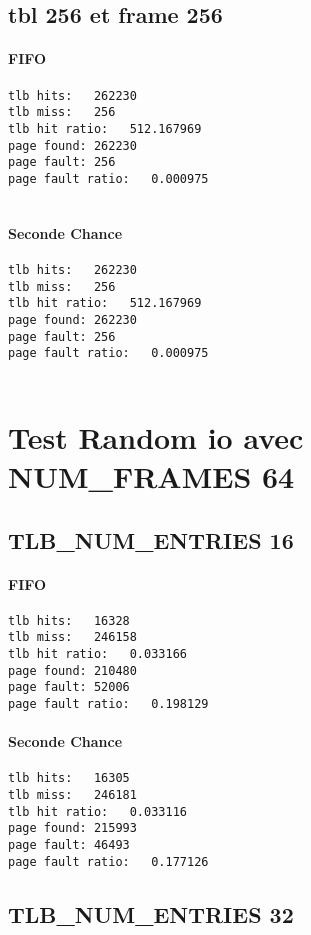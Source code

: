 \documentclass{article}
\begin{document}
\subsection*{tbl 256 et frame 256}
\paragraph{FIFO}
\begin{lstlisting}
tlb hits:   262230
tlb miss:   256
tlb hit ratio:   512.167969
page found: 262230
page fault: 256
page fault ratio:   0.000975


\end{lstlisting}
\paragraph{Seconde Chance}
\begin{lstlisting}
tlb hits:   262230
tlb miss:   256
tlb hit ratio:   512.167969
page found: 262230
page fault: 256
page fault ratio:   0.000975


\end{lstlisting}
\section*{Test Random io avec NUM_FRAMES   64}
\subsection*{TLB_NUM_ENTRIES   16 }

\paragraph{FIFO}
\begin{lstlisting}
tlb hits:   16328
tlb miss:   246158
tlb hit ratio:   0.033166
page found: 210480
page fault: 52006
page fault ratio:   0.198129

\end{lstlisting}
\paragraph{Seconde Chance}
\begin{lstlisting}
tlb hits:   16305
tlb miss:   246181
tlb hit ratio:   0.033116
page found: 215993
page fault: 46493
page fault ratio:   0.177126

\end{lstlisting}
\subsection*{TLB_NUM_ENTRIES   32}
\end{document}
